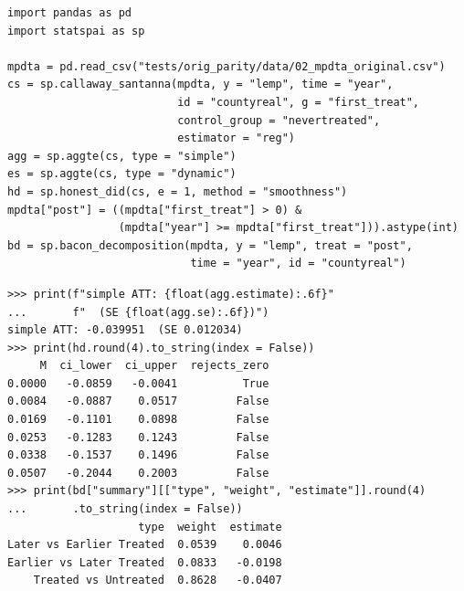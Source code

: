 \begin{lstlisting}[float=tb,caption={Callaway--Sant'Anna fit, simple and
event-study aggregation, Rambachan--Roth bounds from the same fitted
object, and the Goodman-Bacon decomposition of the two-way fixed-effects
comparison weights.},label={lst:csdid},captionpos=b]
import pandas as pd
import statspai as sp

mpdta = pd.read_csv("tests/orig_parity/data/02_mpdta_original.csv")
cs = sp.callaway_santanna(mpdta, y = "lemp", time = "year",
                          id = "countyreal", g = "first_treat",
                          control_group = "nevertreated",
                          estimator = "reg")
agg = sp.aggte(cs, type = "simple")
es = sp.aggte(cs, type = "dynamic")
hd = sp.honest_did(cs, e = 1, method = "smoothness")
mpdta["post"] = ((mpdta["first_treat"] > 0) &
                 (mpdta["year"] >= mpdta["first_treat"])).astype(int)
bd = sp.bacon_decomposition(mpdta, y = "lemp", treat = "post",
                            time = "year", id = "countyreal")
\end{lstlisting}

\begin{lstlisting}[float=tb,caption={Output of
Listing~\ref{lst:csdid}: the simple aggregate over all post-treatment
periods, the effect at event time \(e=1\) with its Rambachan--Roth
smoothness bounds, and the Goodman-Bacon weights. \code{M} bounds the
change in slope of the differential trend between consecutive periods
(Equation~\ref{eq:delta-sd}); \code{rejects\_zero} is whether the robust
confidence set excludes zero at that bound.},label={lst:csdid-output},captionpos=b]
>>> print(f"simple ATT: {float(agg.estimate):.6f}"
...       f"  (SE {float(agg.se):.6f})")
simple ATT: -0.039951  (SE 0.012034)
>>> print(hd.round(4).to_string(index = False))
     M  ci_lower  ci_upper  rejects_zero
0.0000   -0.0859   -0.0041          True
0.0084   -0.0887    0.0517         False
0.0169   -0.1101    0.0898         False
0.0253   -0.1283    0.1243         False
0.0338   -0.1537    0.1496         False
0.0507   -0.2044    0.2003         False
>>> print(bd["summary"][["type", "weight", "estimate"]].round(4)
...       .to_string(index = False))
                    type  weight  estimate
Later vs Earlier Treated  0.0539    0.0046
Earlier vs Later Treated  0.0833   -0.0198
    Treated vs Untreated  0.8628   -0.0407
\end{lstlisting}

